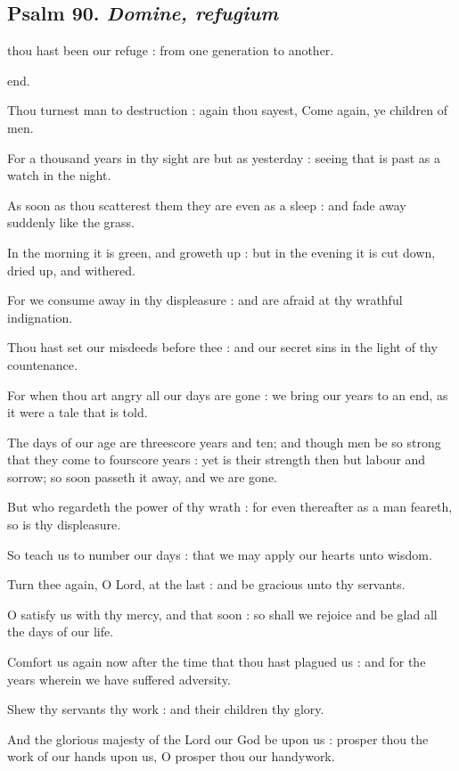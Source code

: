 \subsection{Psalm 90. \textit{Domine, refugium}}

 thou hast been our refuge : from one generation to another.\par
\noindent
end.\par
{}Thou turnest man to destruction : again thou sayest, Come again, ye children of men.\par
{}For a thousand years in thy sight are but as yesterday : seeing that is past as a watch in the night.\par
{}As soon as thou scatterest them they are even as a sleep : and fade away suddenly like the grass.\par
{}In the morning it is green, and groweth up : but in the evening it is cut down, dried up, and withered.\par
{}For we consume away in thy displeasure : and are afraid at thy wrathful indignation.\par
{}Thou hast set our misdeeds before thee : and our secret sins in the light of thy countenance.\par
{}For when thou art angry all our days are gone : we bring our years to an end, as it were a tale that is told.\par
{}The days of our age are threescore years and ten; and though men be so strong that they come to fourscore years : yet is their strength then but labour and sorrow; so soon passeth it away, and we are gone.\par
{}But who regardeth the power of thy wrath : for even thereafter as a man feareth, so is thy displeasure.\par
{}So teach us to number our days : that we may apply our hearts unto wisdom.\par
{}Turn thee again, O Lord, at the last : and be gracious unto thy servants.\par
{}O satisfy us with thy mercy, and that soon : so shall we rejoice and be glad all the days of our life.\par
{}Comfort us again now after the time that thou hast plagued us : and for the years wherein we have suffered adversity.\par
{}Shew thy servants thy work : and their children thy glory.\par
{}And the glorious majesty of the Lord our God be upon us : prosper thou the work of our hands upon us, O prosper thou our handywork.\par

